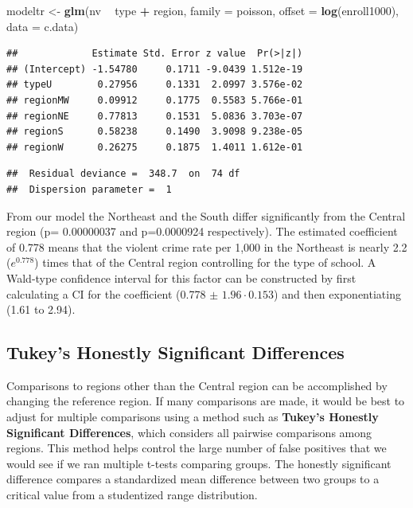\documentclass[
]{krantz}
\newenvironment{Shaded}{\begin{snugshade}}{\end{snugshade}}
\newcommand{\DataTypeTok}[1]{\textcolor[rgb]{0.27,0.27,0.27}{#1}}
\newcommand{\KeywordTok}[1]{\textcolor[rgb]{0.27,0.27,0.27}{\textbf{#1}}}
\newcommand{\NormalTok}[1]{#1}
\newcommand{\OperatorTok}[1]{\textcolor[rgb]{0.43,0.43,0.43}{\textbf{#1}}}
\newcommand{\StringTok}[1]{\textcolor[rgb]{0.5,0.5,0.5}{#1}}
\begin{document}
\begin{Shaded}
\begin{Highlighting}[]
\NormalTok{modeltr <-}\StringTok{ }\KeywordTok{glm}\NormalTok{(nv }\OperatorTok{~}\StringTok{ }\NormalTok{type }\OperatorTok{+}\StringTok{ }\NormalTok{region, }\DataTypeTok{family =}\NormalTok{ poisson,}
               \DataTypeTok{offset =} \KeywordTok{log}\NormalTok{(enroll1000), }\DataTypeTok{data =}\NormalTok{ c.data)}
\end{Highlighting}
\end{Shaded}

\begin{verbatim}
##             Estimate Std. Error z value  Pr(>|z|)
## (Intercept) -1.54780     0.1711 -9.0439 1.512e-19
## typeU        0.27956     0.1331  2.0997 3.576e-02
## regionMW     0.09912     0.1775  0.5583 5.766e-01
## regionNE     0.77813     0.1531  5.0836 3.703e-07
## regionS      0.58238     0.1490  3.9098 9.238e-05
## regionW      0.26275     0.1875  1.4011 1.612e-01
\end{verbatim}

\begin{verbatim}
##  Residual deviance =  348.7  on  74 df 
##  Dispersion parameter =  1
\end{verbatim}

From our model the Northeast and the South differ significantly from the Central region (p= 0.00000037 and p=0.0000924 respectively). The estimated coefficient of 0.778 means that the violent crime rate per 1,000 in the Northeast is nearly 2.2 (\(e^{0.778}\)) times that of the Central region controlling for the type of school. A Wald-type confidence interval for this factor can be constructed by first calculating a CI for the coefficient (0.778 \(\pm\) \(1.96 \cdot 0.153\)) and then exponentiating (1.61 to 2.94).

\hypertarget{tukeys-honestly-significant-differences}{%
\subsection{Tukey's Honestly Significant Differences}\label{tukeys-honestly-significant-differences}}

Comparisons to regions other than the Central region can be accomplished by changing the reference region. If many comparisons are made, it would be best to adjust for multiple comparisons using a method such as \textbf{Tukey's Honestly Significant Differences},  which considers all pairwise comparisons among regions. This method helps control the large number of false positives that we would see if we ran multiple t-tests comparing groups. The honestly significant difference compares a standardized mean difference between two groups to a critical value from a studentized range distribution.
\end{document}
